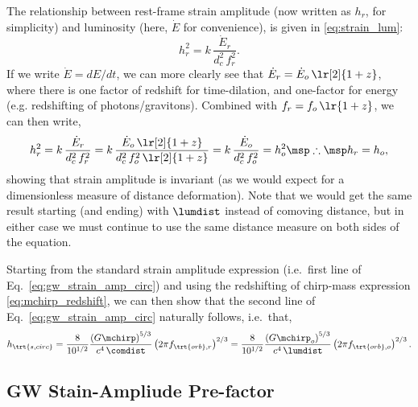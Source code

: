 \documentclass[10pt, oneside, onecolumn]{article}   	%
\newcommand{\hscirc}{h_\trt{s,circ}}
\newcommand{\frstorb}{f_{\trt{orb},r}}
\newcommand{\fobsorb}{f_{\trt{orb},o}}
\begin{document}
            The relationship between rest-frame strain amplitude (now written as $h_r$, for simplicity) and luminosity (here, $\dot{E}$ for convenience), is given in \eqref{eq:strain_lum}:
            \begin{equation}
                h_r^2 = k \, \frac{\dot{E}_r}{d_c^2 \, f_r^2}.
            \end{equation}
            If we write $\dot{E} = dE/dt$, we can more clearly see that $\dot{E}_r = \dot{E}_o \, \lr[2]{1+z}$, where there is one factor of redshift for time-dilation, and one-factor for energy (e.g. redshifting of photons/gravitons).  Combined with $f_r = f_o \, \lr{1+z}$, we can then write,
            \begin{equation}
                h_r^2 = k \, \frac{\dot{E}_r}{d_c^2 \, f_r^2} = k \, \frac{\dot{E}_o \, \lr[2]{1+z}}{d_c^2 \, f_o^2 \, \lr[2]{1+z}} = k \, \frac{\dot{E}_o}{d_c^2 \, f_o^2} = h_o^2 \msp \therefore \msp h_r = h_o,
            \end{equation}
            showing that strain amplitude is invariant (as we would expect for a dimensionless measure of distance deformation).  Note that we would get the same result starting (and ending) with $\lumdist$ instead of comoving distance, but in either case we must continue to use the same distance measure on both sides of the equation.

            Starting from the standard strain amplitude expression (i.e.~first line of Eq.~\ref{eq:gw_strain_amp_circ}) and using the redshifting of chirp-mass expression \eqref{eq:mchirp_redshift}, we can then show that the second line of Eq.~\ref{eq:gw_strain_amp_circ} naturally follows, i.e.~that,
            \begin{equation}
                \hscirc
                = \frac{8}{10^{1/2}} \frac{\left(G\mchirp\right)^{5/3}}{c^4 \, \comdist} \left(2 \pi \frstorb \right)^{2/3}
                = \frac{8}{10^{1/2}} \frac{\left(G\mchirp_o\right)^{5/3}}{c^4 \, \lumdist} \left(2 \pi \fobsorb \right)^{2/3}.
            \end{equation}


        \subsection{GW Stain-Ampliude Pre-factor}


    
    
\end{document}

